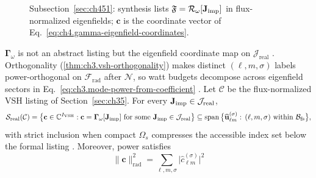 \begin{figure}[t]
\centering
{}
\caption{Subsection~\ref{sec:ch451}: synthesis lists \(\mathfrak{F}=\mathcal{R}_\omega[\mathbf{J}_{\mathrm{imp}}]\) in flux-normalized
eigenfields; \(\mathbf{c}\) is the coordinate vector of Eq.~\eqref{eq:ch4.gamma-eigenfield-coordinates}.}
\label{fig:ch4.eigenfield-coupling-chain}
\end{figure}
\(\boldsymbol{\Gamma}_\omega\) is not an abstract listing but the eigenfield coordinate map on
\(\mathcal{J}_{\mathrm{real}}\) \cite{harrington2001}. Orthogonality
(\ref{thm:ch3.vsh-orthogonality}) makes distinct \((\ell,m,\sigma)\) labels power-orthogonal on
\(\mathcal{F}_{\mathrm{rad}}\) after \(\mathcal{N}\), so watt budgets decompose across eigenfield sectors in
Eq.~\eqref{eq:ch3.mode-power-from-coefficient} \cite{hansen1988}.
\label{thm:ch4.eigenfield-synthesis-coordinates}
Let \(\mathcal{C}\) be the flux-normalized VSH listing of Section~\ref{sec:ch35}. For every
\(\mathbf{J}_{\mathrm{imp}}\in\mathcal{J}_{\mathrm{real}}\),
\begin{equation}
\label{eq:ch4.synthesis-set-eigenfield}
\mathcal{S}_{\mathrm{real}}(\mathcal{C})
=
\left\{
\mathbf{c}\in\mathbb{C}^{I_{\mathrm{VSH}}}:
\mathbf{c}=\boldsymbol{\Gamma}_\omega[\Jimp]\ \text{for some}\ \Jimp\in\mathcal{J}_{\mathrm{real}}
\right\}
\subseteq
\operatorname{span}\big\{
\widehat{\mathbf{u}}_{\ell m}^{(\sigma)}:\,
(\ell,m,\sigma)\ \text{within}\ \mathcal{B}_{\mathrm{fs}}
\big\},
\end{equation}
with strict inclusion when compact \(\Omega_{s}\) compresses the accessible index set below the formal listing
\cite{stratton1941}. Moreover, power satisfies
\begin{equation}
\label{eq:ch4.eigenfield-power-decomposition}
\|\mathbf{c}\|_{\mathrm{rad}}^{2}
=
\sum_{\ell,m,\sigma}
\big|\widehat{c}_{\ell m}^{(\sigma)}\big|^{2}
\end{equation}
